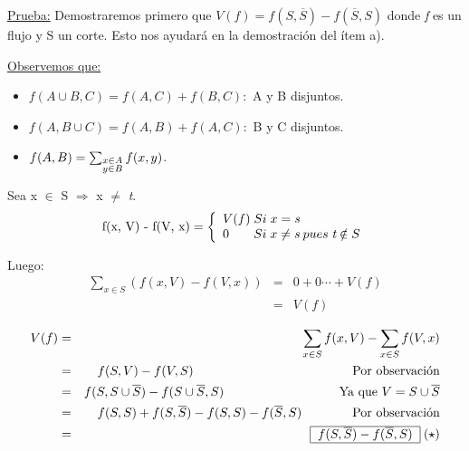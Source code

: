 \documentclass[12pt,a4paper]{report}
\newcounter{neq}
\begin{document}
		\underline{Prueba:} Demostraremos primero que $V(\textit{f}) = f(S, \overline{S}) - f(\overline{S},S)$ donde \textit{f} es un flujo y S un corte. Esto nos ayudará en la demostración del ítem a).
		
		\vspace{5mm}
		\underline{Observemos que:}
		\begin{itemize}
			\item $f(A \cup B, C) = f(A,C) + f(B,C):$ A y B disjuntos.
			\item $f(A, B \cup C) = f(A,B) + f(A,C):$ B y C disjuntos.
			\item $f(A, B) = \sum_{\begin{subarray}{l} x \in A\\
y \in B\end{subarray}} f(x, y)$.
		\end{itemize}

		Sea x $\in$ S $\Rightarrow$ x $\neq$ \textit{t}.
		\begin{equation*}
			\textup{f(x, V) - f(V, x)} =
  			\left\lbrace
  			\begin{array}{l}
    		 V(f) \; Si \; x= \textit{s} \\
     		 0 \; \; \; \; \; \; \;  Si \; x \neq \textit{s} \; pues \; \textit{t} \notin S \\
  			\end{array}
 			 \right.
		\end{equation*}
		
		Luego:
		\begin{eqnarray}
			\nonumber \sum_{x \in S}(f(x, V) - f(V, x)) & = & 0 + 0 \dotsb + V(f) \\
			\nonumber & = & V(f)
		\end{eqnarray}
		
		\begin{flushright}
			\begin{eqnarray}
			\nonumber V(f) & = & \sum_{x \in S}f(x, V) - \sum_{x \in S}f(V, x) \\
			\nonumber & = & f(S, V) - f(V, S) \;\;\qquad\qquad\qquad\qquad\qquad\qquad\text{Por observación} \\
			\nonumber & = & f(S, S \cup \overline{S}) - f(S \cup \overline{S}, S) \;\;\;\;\qquad\qquad\qquad\qquad\text{Ya que } V = S \cup \overline{S} \\
           \nonumber & = & f(S, S) + f(S, \overline{S}) - f(S, S) -  f(\overline{S}, S) \qquad\qquad\text{Por observación} \\
           \nonumber & = & \begin{tabular}{|c|} \hline $f(S, \overline{S}) - f(\overline{S}, S)$ \\ \hline \end{tabular} \; (\star)
		\end{eqnarray}
		\end{flushright}
		
\end{document}
